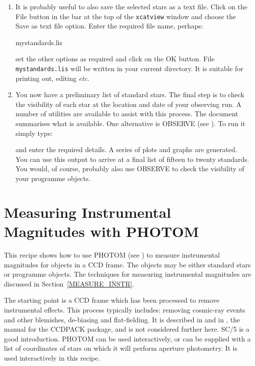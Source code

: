 \documentclass[twoside,11pt,nolof]{starlink}
\begin{document}
\begin{enumerate}
  \item It is probably useful to also save the selected stars as a
   text file.  Click on the \textsf{File} button in the bar at the top of
   the \texttt{xcatview} window and choose the \textsf{Save as text file}
   option.  Enter the required file name, perhaps:

\begin{terminalv}
mystandards.lis
\end{terminalv}

   set the other options as required and click on the \textsf{OK} button.
   File \texttt{mystandards.lis} will be written in your current directory.
   It is suitable for printing out, editing \emph{etc}.

  \item You now have a preliminary list of standard stars.  The final
   step is to check the visibility of each star at the location and
   date of your observing run.  A number of utilities are available to
   assist with this process.  The document \/\cite{SG10} summarises what is available.  One
   alternative is OBSERVE (see \cite{SUN146}).
   To run it simply type:

\begin{terminalv}
\end{terminalv}

   and enter the required details.  A series of plots and graphs are
   generated.  You can use this output to arrive at a final list of
   fifteen to twenty standards.  You would, of course, probably also
   use OBSERVE to check the visibility of your programme objects.

\end{enumerate}



\newpage
\section{\label{PHOTOM_RECIP}Measuring Instrumental
Magnitudes with PHOTOM}

This recipe shows how to use PHOTOM (see \cite{SUN45})
to measure instrumental magnitudes for objects in a CCD frame.  The
objects may be either standard stars or programme objects.  The
techniques for measuring instrumental magnitudes are discussed in
Section~\ref{MEASURE_INSTR}.

The starting point is a CCD frame which has been processed to remove
instrumental effects.  This process typically includes: removing
cosmic-ray events and other blemishes, de-biasing and flat-fielding.  It
is described in \/\cite{SC5} and in \cite{SUN139},
the manual for the CCDPACK package, and is not considered further here.
SC/5 is a good introduction.  PHOTOM can be used interactively, or can be
supplied with a list of coordinates of stars on which it will perform
aperture photometry.  It is used interactively in this recipe.
\end{document}
